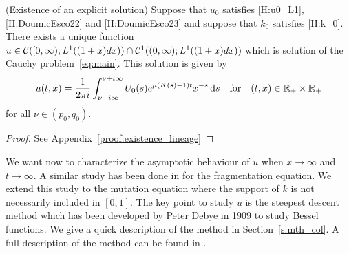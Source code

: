 \begin{theorem}(Existence of an explicit solution) 
    \label{t:existence_lineage}
    Suppose that  $u_0$ satisfies \eqref{H:u0_L1}, \eqref{H:DoumicEsco22} and \eqref{H:DoumicEsco23} and suppose that $k_0$ satisfies \eqref{H:k_0}. 
    There exists a unique function $u \in \mathcal{C}([0, \infty); L^1((1+x)dx)) \cap \mathcal{C}^1((0, \infty); L^1((1+x)dx))$ which is solution of the Cauchy problem~\eqref{eq:main}. This solution is given by 
    \begin{equation}
        \label{eq:explicit_reconstruction}
        u(t,x) = \frac{1}{2\pi i} \int_{\nu-i\infty}^{\nu+i\infty} U_0(s) e^{\mu(K(s)-1)t}x^{-s} \,\mathrm{d} s 
        \quad \text{for} \quad (t,x) \in \mathbb{R}_+ \times \mathbb{R}_+
    \end{equation}
    for all $\nu \in (p_0, q_0)$.
    \end{theorem}
    \begin{proof}
        See Appendix~\ref{proof:existence_lineage}
    \end{proof}

    We want now to characterize the asymptotic behaviour of $u$ when $x \to \infty$ and $t \to \infty$. A similar study has been done in \cite{doumic2016time} for the fragmentation equation. We extend this study to the mutation equation where the support of $k$ is not necessarily included in $[0, 1]$. 
    The key point to study $u$ is the steepest descent method which has been developed by Peter Debye in 1909 \cite{debye1909naherungsformeln} to study Bessel functions. We give a quick description of the method in Section~\ref{s:mth_col}. A full description of the method can be found in \cite{dieudonne1980calcul}. 

